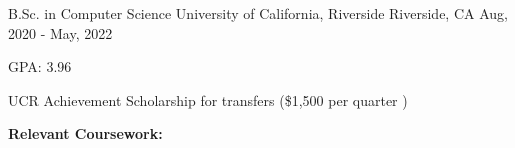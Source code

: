 
\begin{cventries}
  \cventry
    {B.Sc. in Computer Science} %
    {University of California, Riverside} %
    {Riverside, CA} %
    {Aug, 2020 -  May, 2022} %
    {
      \begin{cvitems} %
        \item {GPA: 3.96}
        \item {UCR Achievement Scholarship for transfers (\$1,500 per quarter )}
        \item []{\textbf{Relevant Coursework:}}
        \item []{
            \begin{flushleft}
            \end{flushleft}
        }
      \end{cvitems}
    }
\end{cventries}
